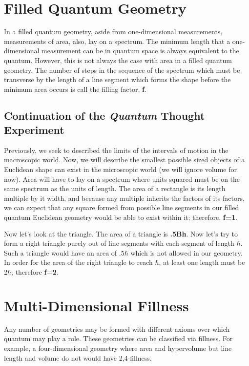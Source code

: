 \documentclass[12pt]{scrreprt}
\begin{document}
\section{Filled Quantum Geometry}
In a filled quantum geometry, aside from one-dimensional measurements, measurements of area, also, lay on a spectrum. The minimum length that a one-dimensional measurement can be in quantum space is always equivalent to the quantum. However, this is not always the case with area in a filled quantum geometry.  The number of steps in the sequence of the spectrum which must be transverse by the length of a line segment which forms the shape before the minimum area occurs is call the filling factor, \textbf{f}.
\subsection{Continuation of the \textit{Quantum} Thought Experiment}
\par Previously, we seek to described the limits of the intervals of motion in the macroscopic world. Now, we will describe the smallest possible sized objects of a Euclidean shape can exist in the microscopic world (we will ignore volume for now). Area will have to lay on a spectrum where units squared must be on the same spectrum as the units of length. The area of a rectangle is its length multiple by it width, and because any multiple inherits the factors of its factors, we can expect that any square formed from possible line segments in our filled quantum Euclidean geometry would be able to exist within it; therefore, \textbf{f=1}. 
\par Now let's look at the triangle. The area of a triangle is \textbf{.5Bh}. Now let's try to form a right triangle purely out of line segments with each segment of length $\hbar$. Such a triangle would have an area of $.5\hbar$ which is not allowed in our geometry. In order for the area of the right triangle to reach $\hbar$, at least one length must be 2$\hbar$; therefore \textbf{f=2}.
\section{Multi-Dimensional Fillness}
Any number of geometries may be formed with different axioms over which quantum may play a role. These geometries can be classified via fillness. For example, a four-dimensional geometry where area and hypervolume but line length and volume do not would have 2,4-fillness.
\end{document}
